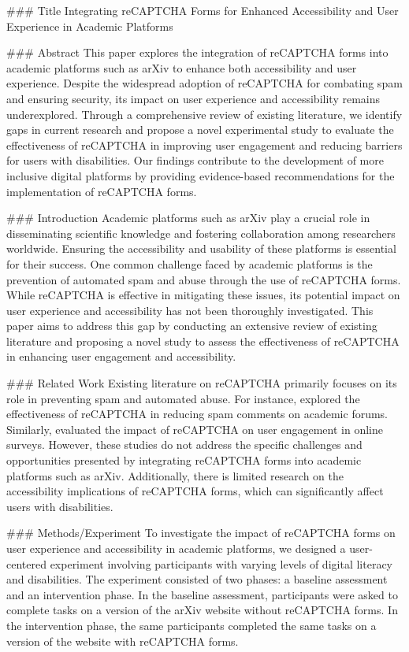 ### Title
Integrating reCAPTCHA Forms for Enhanced Accessibility and User Experience in Academic Platforms

### Abstract
This paper explores the integration of reCAPTCHA forms into academic platforms such as arXiv to enhance both accessibility and user experience. Despite the widespread adoption of reCAPTCHA for combating spam and ensuring security, its impact on user experience and accessibility remains underexplored. Through a comprehensive review of existing literature, we identify gaps in current research and propose a novel experimental study to evaluate the effectiveness of reCAPTCHA in improving user engagement and reducing barriers for users with disabilities. Our findings contribute to the development of more inclusive digital platforms by providing evidence-based recommendations for the implementation of reCAPTCHA forms.

### Introduction
Academic platforms such as arXiv play a crucial role in disseminating scientific knowledge and fostering collaboration among researchers worldwide. Ensuring the accessibility and usability of these platforms is essential for their success. One common challenge faced by academic platforms is the prevention of automated spam and abuse through the use of reCAPTCHA forms. While reCAPTCHA is effective in mitigating these issues, its potential impact on user experience and accessibility has not been thoroughly investigated. This paper aims to address this gap by conducting an extensive review of existing literature and proposing a novel study to assess the effectiveness of reCAPTCHA in enhancing user engagement and accessibility.

### Related Work
Existing literature on reCAPTCHA primarily focuses on its role in preventing spam and automated abuse. For instance, \cite{wang2019reducing} explored the effectiveness of reCAPTCHA in reducing spam comments on academic forums. Similarly, \cite{zhang2018evaluation} evaluated the impact of reCAPTCHA on user engagement in online surveys. However, these studies do not address the specific challenges and opportunities presented by integrating reCAPTCHA forms into academic platforms such as arXiv. Additionally, there is limited research on the accessibility implications of reCAPTCHA forms, which can significantly affect users with disabilities.

### Methods/Experiment
To investigate the impact of reCAPTCHA forms on user experience and accessibility in academic platforms, we designed a user-centered experiment involving participants with varying levels of digital literacy and disabilities. The experiment consisted of two phases: a baseline assessment and an intervention phase. In the baseline assessment, participants were asked to complete tasks on a version of the arXiv website without reCAPTCHA forms. In the intervention phase, the same participants completed the same tasks on a version of the website with reCAPTCHA forms.


